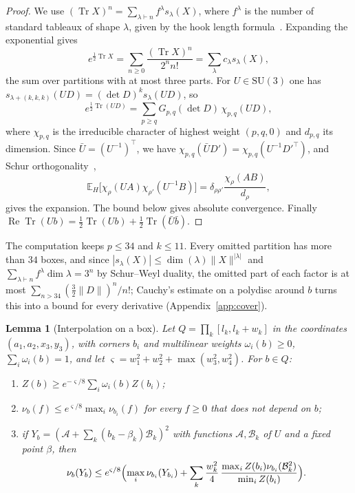 \documentclass[11pt]{amsart}
\newtheorem{lemma}[theorem]{Lemma}
\theoremstyle{definition}
\theoremstyle{remark}
\numberwithin{equation}{section}
\newcommand{\E}{\mathbb{E}}
\newcommand{\SU}{\mathrm{SU}}
\newcommand{\Tr}{\operatorname{Tr}}
\newcommand{\ReTr}{\operatorname{Re}\operatorname{Tr}}
\begin{document}
\begin{proof}
We use $(\Tr X)^n=\sum_{\lambda\vdash n}f^\lambda s_\lambda(X)$, where
$f^\lambda$ is the number of standard tableaux of shape $\lambda$, given by
the hook length formula~\cite[Cor.~7.21.6]{Sta99}. Expanding the
exponential gives
\[
e^{\frac12\Tr X}=\sum_{n\ge0}\frac{(\Tr X)^n}{2^nn!}=\sum_\lambda
c_\lambda s_\lambda(X),
\]
the sum over partitions with at most three parts. For $U\in\SU(3)$ one has
$s_{\lambda+(k,k,k)}(UD)=(\det D)^ks_\lambda(UD)$, so
\[
e^{\frac12\Tr(UD)}=\sum_{p\ge q}G_{p,q}(\det D)\,\chi_{p,q}(UD),
\]
where $\chi_{p,q}$ is the irreducible character of highest weight
$(p,q,0)$ and $d_{p,q}$ its dimension. Since $\bar U=(U^{-1})^\top$, we have
$\chi_{p,q}(\bar UD')=\chi_{p,q}(U^{-1}D'^\top)$, and Schur
orthogonality~\cite[Ch.~2]{Bum13},
\[
\E_H\bigl[\chi_\rho(UA)\chi_{\rho'}(U^{-1}B)\bigr]=
\delta_{\rho\rho'}\frac{\chi_\rho(AB)}{d_\rho},
\]
gives the expansion. The bound below gives absolute convergence. Finally $\ReTr(Ub)=
\frac12\Tr(Ub)+\frac12\Tr(\bar U\bar b)$.
\end{proof}

The computation keeps $p\le34$ and $k\le11$. Every omitted partition has
more than $34$ boxes, and since $|s_\lambda(X)|\le\dim(\lambda)\|X\|^{|\lambda|}$ and
$\sum_{\lambda\vdash n}f^\lambda\dim\lambda=3^n$ by Schur--Weyl duality, the omitted
part of each factor is at most $\sum_{n>34}(\frac32\|D\|)^n/n!$; Cauchy's
estimate on a polydisc around $b$ turns this into a bound for every
derivative (Appendix~\ref{app:cover}).

\begin{lemma}[Interpolation on a box]\label{lem:boxes}
Let $Q=\prod_k[l_k,l_k+w_k]$ in the coordinates $(a_1,a_2,x_3,y_3)$, with
corners $b_i$ and multilinear weights $\omega_i(b)\ge0$, $\sum_i\omega_i(b)=1$,
and let $\varsigma=w_1^2+w_2^2+\max(w_3^2,w_4^2)$. For $b\in Q$:
\begin{enumerate}[label=\textup{(\roman*)},leftmargin=*]
\item $Z(b)\ge e^{-\varsigma/8}\sum_i\omega_i(b)Z(b_i)$;
\item $\nu_b(f)\le e^{\varsigma/8}\max_i\nu_{b_i}(f)$ for every $f\ge0$ that
does not depend on $b$;
\item if $Y_b=(\mathcal A+\sum_k(b_k-\beta_k)\mathcal B_k)^2$ with functions
$\mathcal A,\mathcal B_k$ of $U$ and a fixed point $\beta$, then
\[
\nu_b(Y_b)\le e^{\varsigma/8}\Bigl(\max_i\nu_{b_i}(Y_{b_i})+\sum_k
\frac{w_k^2}4\,\frac{\max_iZ(b_i)\nu_{b_i}(\mathcal B_k^2)}{\min_iZ(b_i)}\Bigr).
\]
\end{enumerate}
\end{lemma}
\end{document}

